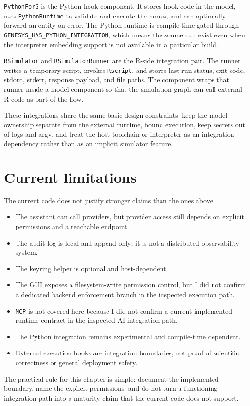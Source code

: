 \texttt{PythonForG} is the Python hook component. It stores hook code in the model, uses \texttt{PythonRuntime} to validate and execute the hooks, and can optionally forward an entity on error. The Python runtime is compile-time gated through \texttt{GENESYS\_HAS\_PYTHON\_INTEGRATION}, which means the source can exist even when the interpreter embedding support is not available in a particular build.

\texttt{RSimulator} and \texttt{RSimulatorRunner} are the R-side integration pair. The runner writes a temporary script, invokes \texttt{Rscript}, and stores last-run status, exit code, stdout, stderr, response payload, and file paths. The component wraps that runner inside a model component so that the simulation graph can call external R code as part of the flow.

These integrations share the same basic design constraints: keep the model ownership separate from the external runtime, bound execution, keep secrets out of logs and argv, and treat the host toolchain or interpreter as an integration dependency rather than as an implicit simulator feature.

\section{Current limitations}
\label{sec:ai-limitations}

The current code does not justify stronger claims than the ones above.
\begin{itemize}
\item The assistant can call providers, but provider access still depends on explicit permissions and a reachable endpoint.
\item The audit log is local and append-only; it is not a distributed observability system.
\item The keyring helper is optional and host-dependent.
\item The GUI exposes a filesystem-write permission control, but I did not confirm a dedicated backend enforcement branch in the inspected execution path.
\item \texttt{MCP} is not covered here because I did not confirm a current implemented runtime contract in the inspected AI integration path.
\item The Python integration remains experimental and compile-time dependent.
\item External execution hooks are integration boundaries, not proof of scientific correctness or general deployment safety.
\end{itemize}

The practical rule for this chapter is simple: document the implemented boundary, name the explicit permissions, and do not turn a functioning integration path into a maturity claim that the current code does not support.
